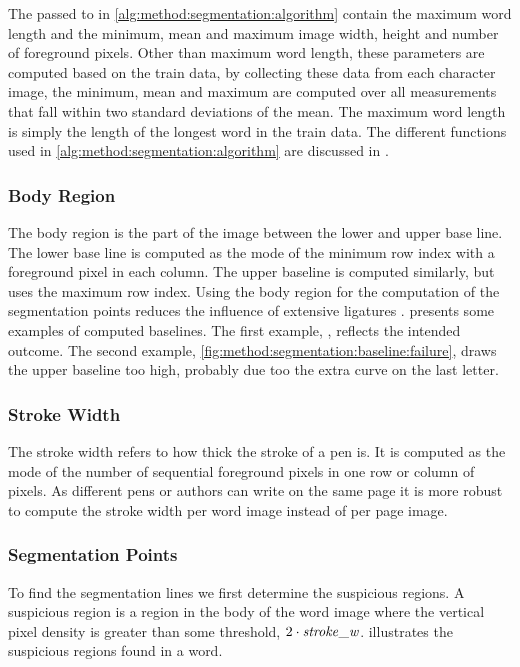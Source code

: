 The \parameters passed to  in \cref{alg:method:segmentation:algorithm} contain the maximum word length and the minimum, mean and maximum image width, height and number of foreground pixels. Other than maximum word length, these parameters are computed based on the train data, by collecting these data from each character image, the minimum, mean and maximum are computed over all measurements that fall within two standard deviations of the mean. The maximum word length is simply the length of the longest word in the train data. The different functions used in \cref{alg:method:segmentation:algorithm} are discussed in .

\subsubsection{Body Region}
\label{sss:method:segmentaton:bodyregion}
	The body region is the part of the image between the lower and upper base line. The lower base line is computed as the mode of the minimum row index with a foreground pixel in each column. The upper baseline is computed similarly, but uses the maximum row index. Using the body region for the computation of the segmentation points reduces the influence of extensive ligatures \cite{lee2012binary}.  presents some examples of computed baselines. The first example, , reflects the intended outcome. The second example, \cref{fig:method:segmentation:baseline:failure}, draws the upper baseline too high, probably due too the extra curve on the last letter.

\subsubsection{Stroke Width}
\label{sss:method:segmentaton:strokwidth}
	The stroke width refers to how thick the stroke of a pen is. It is computed as the mode of the number of sequential foreground pixels in one row or column of pixels. As different pens or authors can write on the same page it is more robust to compute the stroke width per word image instead of per page image.

\subsubsection{Segmentation Points}
\label{sss:method:segmentaton:segmentationpoints}
	To find the segmentation lines we first determine the suspicious regions. A suspicious region is a region in the body of the word image where the vertical pixel density is greater than some threshold, $2 \cdot \mathit{stroke\_w}$.  illustrates the suspicious regions found in a word. 

